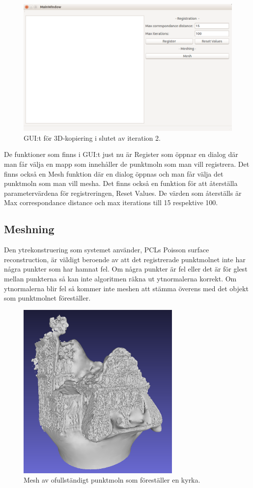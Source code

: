 \begin{figure}[H]
	\centering
	\includegraphics[width=130mm]{figures/3DCopyGUI.PNG}
	\caption{GUI:t för 3D-kopiering i slutet av iteration 2.}
	\label{fig:3dcopy_gui_res}
\end{figure}

De funktioner som finns i GUI:t just nu är Register som öppnar en dialog där man får välja en mapp som innehåller de punktmoln som man vill registrera. Det finns också en Mesh funktion där en dialog öppnas och man får välja det punktmoln som man vill mesha. Det finns också en funktion för att återställa parametervärdena för registreringen, Reset Values. De värden som återställs är Max correspondance distance och max iterations till 15 respektive 100.

\subsection{Meshning}

Den ytrekonstruering som systemet använder, PCLs Poisson surface reconstruction, är väldigt beroende av att det registrerade punktmolnet inte har några punkter som har hamnat fel. Om några punkter är fel eller det är för glest mellan punkterna så kan inte algoritmen räkna ut ytnormalerna korrekt. Om ytnormalerna blir fel så kommer inte meshen att stämma överens med det objekt som punktmolnet föreställer.

\begin{figure}[H]
	\centering
	\includegraphics[width=80mm]{figures/3DCopyMeshChurch.PNG}
	\caption{Mesh av ofullständigt punktmoln som föreställer en kyrka.}
	\label{fig:3dcopy_mesh_church}
\end{figure}

